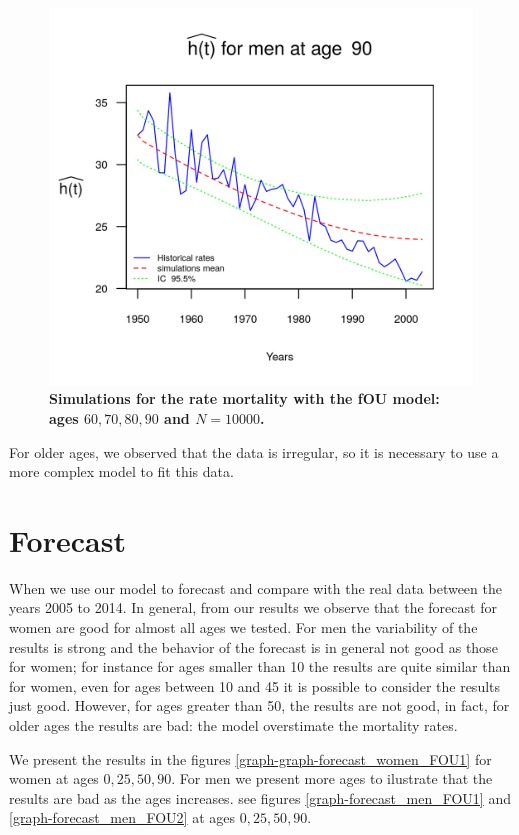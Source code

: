 \documentclass[smallextended]{svjour3}
\begin{document}
\begin{figure}[H]
    \includegraphics{PlotMen90.png}
    \caption{\bf Simulations for the rate mortality with the fOU model: ages
    $60,70,80,90$ and $N=10000$.}
    \label{graph-simu_FOU4}
\end{figure}\vspace*{0.1cm}

For older ages, we observed that the data is irregular, so it is necessary to
use a more complex model to
fit this data.

\section{Forecast}

When we use our model to forecast and compare with the real data between the
years 2005 to 2014. In general, from our results we observe that the forecast
for women are good for almost all ages we tested. For men the variability of
the results is strong and the behavior of the forecast is in general not good
as those for women; for instance for ages smaller than 10 the results are quite
similar than for women, even for ages between 10 and 45 it is possible to
consider the results just good. However, for ages greater than 50, the results
are not good, in fact, for older ages the results are bad: the model
overstimate the mortality rates.

We present the results in the figures \ref{graph-graph-forecast_women_FOU1} for
women at ages $0,25,50,90$. For men we present more ages to ilustrate that the
results are bad as the ages increases. see figures
\ref{graph-forecast_men_FOU1} and \ref{graph-forecast_men_FOU2} at ages
$0,25,50,90$.
\end{document}
